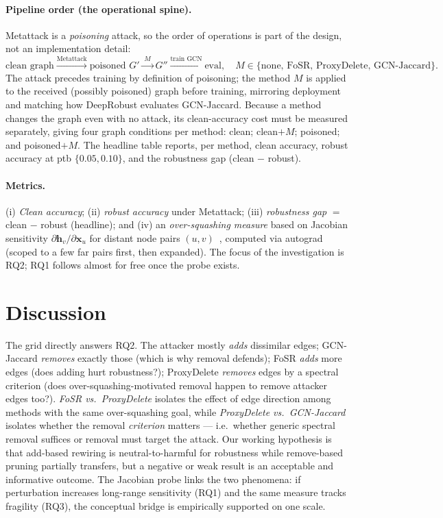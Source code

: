 \documentclass[10pt]{article}
\begin{document}
\paragraph{Pipeline order (the operational spine).} Metattack is a \emph{poisoning} attack, so the
order of operations is part of the design, not an implementation detail:
\[
\text{clean graph} \xrightarrow{\text{Metattack}} \text{poisoned } G'
\xrightarrow{\;M\;} G'' \xrightarrow{\text{train GCN}} \text{eval},
\quad M \in \{\text{none, FoSR, ProxyDelete, GCN-Jaccard}\}.
\]
The attack precedes training by definition of poisoning; the method $M$ is applied to the received
(possibly poisoned) graph before training, mirroring deployment and matching how DeepRobust evaluates
GCN-Jaccard. Because a method changes the graph even with no attack, its clean-accuracy cost must be
measured separately, giving four graph conditions per method: clean; clean${+}M$; poisoned; and
poisoned${+}M$. The headline table reports, per method, clean accuracy, robust accuracy at ptb
$\{0.05, 0.10\}$, and the robustness gap (clean $-$ robust).

\paragraph{Metrics.} (i) \emph{Clean accuracy}; (ii) \emph{robust accuracy} under Metattack;
(iii) \emph{robustness gap} $=$ clean $-$ robust (headline); and (iv) an \emph{over-squashing measure}
based on Jacobian sensitivity $\partial \mathbf{h}_v / \partial \mathbf{x}_u$ for distant node pairs
$(u,v)$~\citep{digiovanni2023oversquashing}, computed via autograd (scoped to a few far pairs first,
then expanded). The focus of the investigation is RQ2; RQ1 follows almost for free once the probe
exists.

\section{Discussion}
The grid directly answers RQ2. The attacker mostly \emph{adds} dissimilar edges; GCN-Jaccard
\emph{removes} exactly those (which is why removal defends); FoSR \emph{adds} more edges (does adding
hurt robustness?); ProxyDelete \emph{removes} edges by a spectral criterion (does over-squashing-motivated
removal happen to remove attacker edges too?). \emph{FoSR vs.\ ProxyDelete} isolates the effect of edge
direction among methods with the same over-squashing goal, while \emph{ProxyDelete vs.\ GCN-Jaccard}
isolates whether the removal \emph{criterion} matters --- i.e.\ whether generic spectral removal suffices
or removal must target the attack. Our working hypothesis is that add-based rewiring is neutral-to-harmful
for robustness while remove-based pruning partially transfers, but a negative or weak result is an
acceptable and informative outcome. The Jacobian probe links the two phenomena: if perturbation increases
long-range sensitivity (RQ1) and the same measure tracks fragility (RQ3), the conceptual bridge is
empirically supported on one scale.
\end{document}

